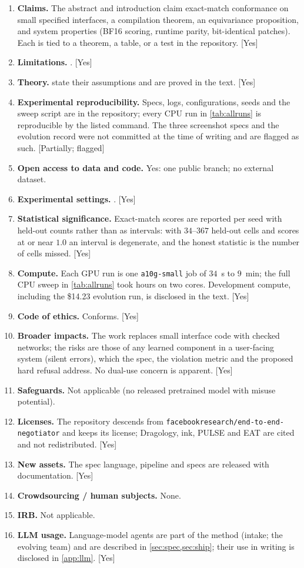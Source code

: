 \begin{enumerate}\setlength{\itemsep}{0pt}
\item \textbf{Claims.} The abstract and introduction claim exact-match conformance on small specified interfaces, a compilation theorem, an equivariance proposition, and system properties (BF16 scoring, runtime parity, bit-identical patches). Each is tied to a theorem, a table, or a test in the repository. [Yes]
\item \textbf{Limitations.} . [Yes]
\item \textbf{Theory.}  state their assumptions and are proved in the text. [Yes]
\item \textbf{Experimental reproducibility.} Specs, logs, configurations, seeds and the sweep script are in the repository; every CPU run in \cref{tab:allruns} is reproducible by the listed command. The three screenshot specs and the evolution record were not committed at the time of writing and are flagged as such. [Partially; flagged]
\item \textbf{Open access to data and code.} Yes: one public branch; no external dataset.
\item \textbf{Experimental settings.} . [Yes]
\item \textbf{Statistical significance.} Exact-match scores are reported per seed with held-out counts rather than as intervals: with $34$--$367$ held-out cells and scores at or near $1.0$ an interval is degenerate, and the honest statistic is the number of cells missed. [Yes]
\item \textbf{Compute.} Each GPU run is one \texttt{a10g-small} job of $34$~s to $9$~min; the full CPU sweep in \cref{tab:allruns} took \sweephours{} hours on two cores. Development compute, including the \$14.23 evolution run, is disclosed in the text. [Yes]
\item \textbf{Code of ethics.} Conforms. [Yes]
\item \textbf{Broader impacts.} The work replaces small interface code with checked networks; the risks are those of any learned component in a user-facing system (silent errors), which the spec, the violation metric and the proposed hard refusal address. No dual-use concern is apparent. [Yes]
\item \textbf{Safeguards.} Not applicable (no released pretrained model with misuse potential).
\item \textbf{Licenses.} The repository descends from \texttt{facebookresearch/end-to-end-negotiator} and keeps its license; Dragology, ink, PULSE and EAT are cited and not redistributed. [Yes]
\item \textbf{New assets.} The spec language, pipeline and specs are released with documentation. [Yes]
\item \textbf{Crowdsourcing / human subjects.} None.
\item \textbf{IRB.} Not applicable.
\item \textbf{LLM usage.} Language-model agents are part of the method (intake; the evolving team) and are described in \cref{sec:spec,sec:ship}; their use in writing is disclosed in \cref{app:llm}. [Yes]
\end{enumerate}
